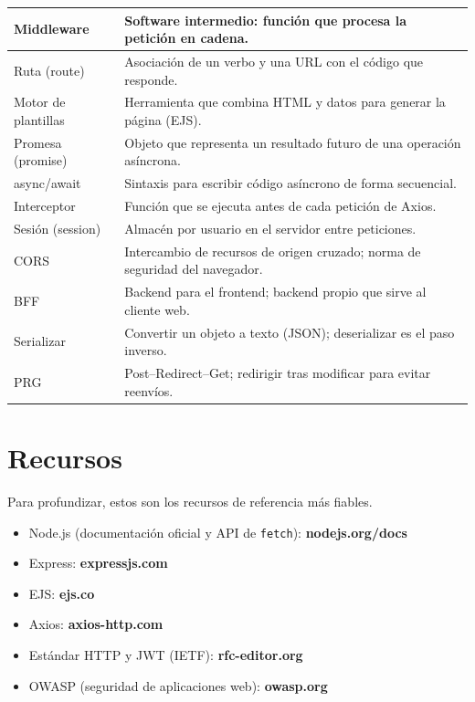\documentclass[11pt]{article}
\begin{document}
{\begin{longtable}{>{\raggedright\arraybackslash}p{3.2cm} >{\raggedright\arraybackslash}p{12.2cm}}
\ttfamily\color{ndverde}Middleware & Software intermedio: función que procesa la petición en cadena. \\ \hline
\ttfamily\color{ndverde}Ruta (route) & Asociación de un verbo y una URL con el código que responde. \\ \hline
\ttfamily\color{ndverde}Motor de plantillas & Herramienta que combina HTML y datos para generar la página (EJS). \\ \hline
\ttfamily\color{ndverde}Promesa (promise) & Objeto que representa un resultado futuro de una operación asíncrona. \\ \hline
\ttfamily\color{ndverde}async/await & Sintaxis para escribir código asíncrono de forma secuencial. \\ \hline
\ttfamily\color{ndverde}Interceptor & Función que se ejecuta antes de cada petición de Axios. \\ \hline
\ttfamily\color{ndverde}Sesión (session) & Almacén por usuario en el servidor entre peticiones. \\ \hline
\ttfamily\color{ndverde}CORS & Intercambio de recursos de origen cruzado; norma de seguridad del navegador. \\ \hline
\ttfamily\color{ndverde}BFF & Backend para el frontend; backend propio que sirve al cliente web. \\ \hline
\ttfamily\color{ndverde}Serializar & Convertir un objeto a texto (JSON); deserializar es el paso inverso. \\ \hline
\ttfamily\color{ndverde}PRG & Post--Redirect--Get; redirigir tras modificar para evitar reenvíos. \\ \hline
\end{longtable}}

\section{Recursos}
Para profundizar, estos son los recursos de referencia más fiables.

\begin{itemize}[leftmargin=1.4em,itemsep=2pt,topsep=2pt]
\item Node.js (documentación oficial y API de \texttt{fetch}): \textbf{nodejs.org/docs}
\item Express: \textbf{expressjs.com}
\item EJS: \textbf{ejs.co}
\item Axios: \textbf{axios-http.com}
\item Estándar HTTP y JWT (IETF): \textbf{rfc-editor.org}
\item OWASP (seguridad de aplicaciones web): \textbf{owasp.org}
\end{itemize}



\end{document}
